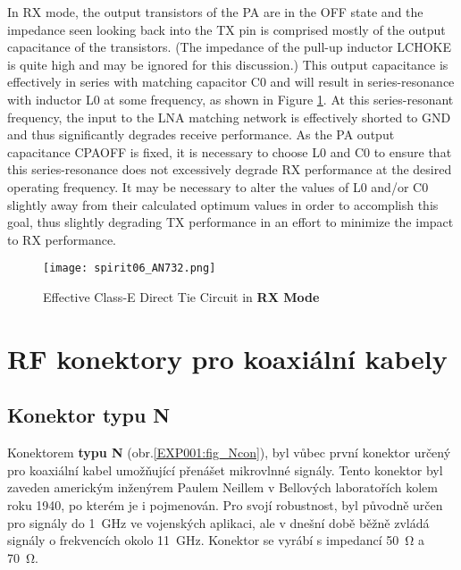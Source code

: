       In RX mode, the output transistors of the PA are in the OFF state and the impedance seen 
      looking back into the TX pin is comprised mostly of the output capacitance of the 
      transistors. (The impedance of the pull-up inductor LCHOKE is quite high and may be ignored 
      for this discussion.) This output capacitance is effectively in series with matching 
      capacitor C0 and will result in series-resonance with inductor L0 at some frequency, as shown 
      in Figure \ref{EXP001:fig_spirit06}. At this series-resonant frequency, the input to the LNA 
      matching network is effectively shorted to GND and thus significantly degrades receive 
      performance. As the PA output capacitance CPAOFF is fixed, it is necessary to choose L0 and 
      C0 to ensure that this series-resonance does not excessively degrade RX performance at the 
      desired operating frequency. It may be necessary to alter the values of L0 and/or C0 slightly 
      away from their calculated optimum values in order to accomplish this goal, thus slightly 
      degrading TX performance in an effort to minimize the impact to RX performance.
      
      \begin{figure}[ht!]  %
        \centering
        \texttt{[image: spirit06\_AN732.png]}
        \caption{Effective Class-E Direct Tie Circuit in \textbf{RX Mode}}
        \label{EXP001:fig_spirit06}
      \end{figure}

  \newpage
  \section{RF konektory pro koaxiální kabely}
    \subsection{Konektor typu N}
      Konektorem \textbf{typu N} (obr.\ref{EXP001:fig_Ncon}), byl vůbec první konektor určený pro 
      koaxiální kabel umožňující přenášet mikrovlnné signály. Tento konektor byl zaveden americkým 
      inženýrem Paulem Neillem v Bellových laboratořích kolem roku 1940, po kterém je i pojmenován. 
      Pro svojí robustnost, byl původně určen pro signály do \SI{1}{\giga\hertz} ve vojenských 
      aplikaci, ale v dnešní době běžně zvládá signály o frekvencích okolo \SI{11}{\giga\hertz}. 
      Konektor se vyrábí s impedancí \SI{50}{\ohm} a \SI{70}{\ohm}.
      
